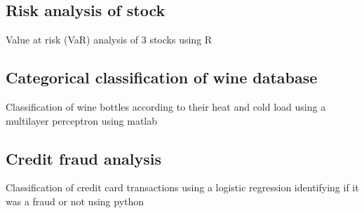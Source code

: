 \subsection{Risk analysis of stock}
\begin{zitemize}
\item Value at risk (VaR) analysis of 3 stocks using R
\end{zitemize}


\subsection{Categorical classification of wine database}
\begin{zitemize}
\item Classification of wine bottles according to their heat and cold load using a multilayer perceptron using matlab
\end{zitemize}

\subsection{Credit fraud analysis}
\begin{zitemize}
\item Classification of credit card transactions using a logistic regression identifying if it was a fraud or not using python
\end{zitemize}